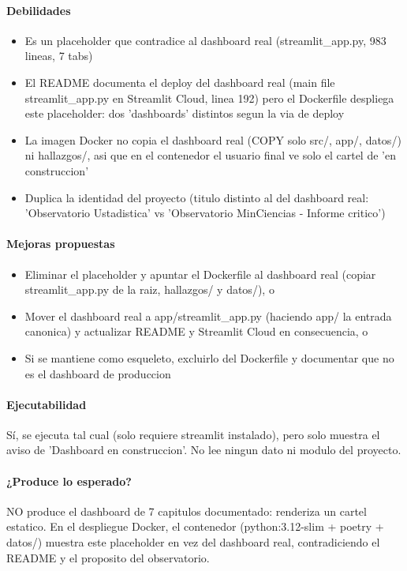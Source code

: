 \paragraph{Debilidades}
\begin{itemize}
  \item Es un placeholder que contradice al dashboard real (streamlit\_app.py, 983 lineas, 7 tabs)
  \item El README documenta el deploy del dashboard real (main file streamlit\_app.py en Streamlit Cloud, linea 192) pero el Dockerfile despliega este placeholder: dos 'dashboards' distintos segun la via de deploy
  \item La imagen Docker no copia el dashboard real (COPY solo src/, app/, datos/) ni hallazgos/, asi que en el contenedor el usuario final ve solo el cartel de 'en construccion'
  \item Duplica la identidad del proyecto (titulo distinto al del dashboard real: 'Observatorio Ustadistica' vs 'Observatorio MinCiencias - Informe critico')
\end{itemize}

\paragraph{Mejoras propuestas}
\begin{itemize}
  \item Eliminar el placeholder y apuntar el Dockerfile al dashboard real (copiar streamlit\_app.py de la raiz, hallazgos/ y datos/), o
  \item Mover el dashboard real a app/streamlit\_app.py (haciendo app/ la entrada canonica) y actualizar README y Streamlit Cloud en consecuencia, o
  \item Si se mantiene como esqueleto, excluirlo del Dockerfile y documentar que no es el dashboard de produccion
\end{itemize}

\paragraph{Ejecutabilidad}
Sí, se ejecuta tal cual (solo requiere streamlit instalado), pero solo muestra el aviso de 'Dashboard en construccion'. No lee ningun dato ni modulo del proyecto.

\paragraph{¿Produce lo esperado?}
NO produce el dashboard de 7 capitulos documentado: renderiza un cartel estatico. En el despliegue Docker, el contenedor (python:3.12-slim + poetry + datos/) muestra este placeholder en vez del dashboard real, contradiciendo el README y el proposito del observatorio.

